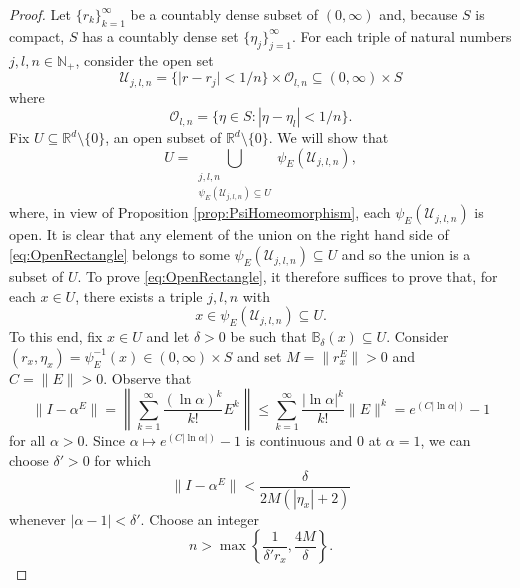 \documentclass[11pt]{article}
\theoremstyle{remark}
\begin{document}
\begin{proof}
Let $\{r_k\}_{k=1}^\infty$ be a countably dense subset of $(0,\infty)$ and, because $S$ is compact, $S$ has a countably dense set $\{\eta_j\}_{j=1}^\infty$.  For each triple of natural numbers $j,l,n\in\mathbb{N}_+$, consider the open set
\begin{equation*}
\mathcal{U}_{j,l,n}=\{ \vert r - r_j \vert < 1/n \}\times \mathcal{O}_{l,n}\subseteq (0,\infty)\times S
\end{equation*}
where
\begin{equation*}
\mathcal{O}_{l,n}=\{\eta\in S: |\eta-\eta_l|<1/n\}.
\end{equation*}
Fix $U\subseteq \mathbb{R}^d\setminus \{0\}$, an open subset of $\mathbb{R}^d\setminus\{0\}$. We will show that
\begin{equation}\label{eq:OpenRectangle}
U=\bigcup_{\substack{j,l,n\\ \psi_E(\mathcal{U}_{j,l,n})\subseteq U}}\psi_E(\mathcal{U}_{j,l,n}),
\end{equation}
where, in view of Proposition \ref{prop:PsiHomeomorphism}, each $\psi_E(\mathcal{U}_{j,l,n})$ is open. It is clear that any element of the union on the right hand side of \eqref{eq:OpenRectangle} belongs to some $\psi_E(\mathcal{U}_{j,l,n}) \subseteq U$ and so the union is a subset of $U$. To prove \eqref{eq:OpenRectangle}, it therefore suffices to prove that, for each $x\in U$, there exists a triple $j,l,n$ with
\begin{equation*}
x\in\psi_E(\mathcal{U}_{j,l,n})\subseteq U.
\end{equation*}
To this end, fix $x\in U$ and let $\delta>0$ be such that $\mathbb{B}_\delta(x)\subseteq U$. Consider $(r_x,\eta_x)=\psi_E^{-1}(x)\in (0,\infty)\times S$ and set $M=\|r_x^E\|>0$ and $C=\|E\|>0$. Observe that 
\begin{equation*}
\|I-\alpha^E\|=\left\|\sum_{k=1}^\infty \frac{(\ln \alpha)^k}{k!} E^k\right\|\leq \sum_{k=1}^\infty \frac{|\ln \alpha|^k}{k!} \|E\|^k=e^{(C|\ln \alpha|)}-1
\end{equation*}
for all $\alpha>0$. Since $\alpha\mapsto e^{(C|\ln \alpha|)}-1$ is continuous and $0$ at $\alpha=1$, we can choose $\delta'>0$ for which
\begin{equation*}
\|I-\alpha ^E\|< \frac{\delta}{2M (  |\eta_x|+2)}
\end{equation*}
whenever $|\alpha-1|<\delta'$. Choose an integer
\begin{equation*}
n>\max \left\{\frac{1}{\delta'r_x}, \frac{4 M }{\delta}\right\}.
\end{equation*}

\end{proof}
\end{document}
